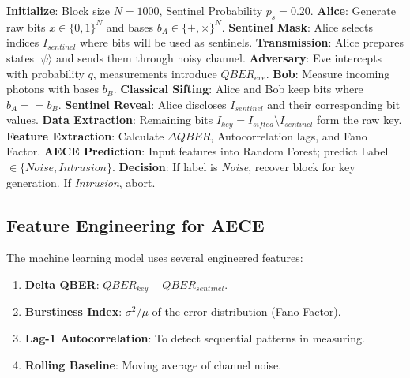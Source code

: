 \documentclass[journal,onecolumn,12pt,draftclsnofoot]{IEEEtran}
\begin{document}
\begin{algorithm}
\caption{AECE-Enhanced BB84 Simulation}
\begin{algorithmic}[1]
\STATE \textbf{Initialize}: Block size $N=1000$, Sentinel Probability $p_s = 0.20$.
\STATE \textbf{Alice}: Generate raw bits $x \in \{0, 1\}^N$ and bases $b_A \in \{+, \times\}^N$.
\STATE \textbf{Sentinel Mask}: Alice selects indices $I_{sentinel}$ where bits will be used as sentinels.
\STATE \textbf{Transmission}: Alice prepares states $|\psi\rangle$ and sends them through noisy channel.
\STATE \textbf{Adversary}: Eve intercepts with probability $q$, measurements introduce $QBER_{eve}$.
\STATE \textbf{Bob}: Measure incoming photons with bases $b_B$.
\STATE \textbf{Classical Sifting}: Alice and Bob keep bits where $b_A == b_B$.
\STATE \textbf{Sentinel Reveal}: Alice discloses $I_{sentinel}$ and their corresponding bit values.
\STATE \textbf{Data Extraction}: Remaining bits $I_{key} = I_{sifted} \setminus I_{sentinel}$ form the raw key.
\STATE \textbf{Feature Extraction}: Calculate $\Delta QBER$, Autocorrelation lags, and Fano Factor.
\STATE \textbf{AECE Prediction}: Input features into Random Forest; predict Label $\in \{Noise, Intrusion\}$.
\STATE \textbf{Decision}: If label is \textit{Noise}, recover block for key generation. If \textit{Intrusion}, abort.
\end{algorithmic}
\end{algorithm}

\subsection{Feature Engineering for AECE}
The machine learning model uses several engineered features:
\begin{enumerate}
    \item \textbf{Delta QBER}: $QBER_{key} - QBER_{sentinel}$.
    \item \textbf{Burstiness Index}: $\sigma^2/\mu$ of the error distribution (Fano Factor).
    \item \textbf{Lag-1 Autocorrelation}: To detect sequential patterns in measuring.
    \item \textbf{Rolling Baseline}: Moving average of channel noise.
\end{enumerate}

\newpage

\end{document}
